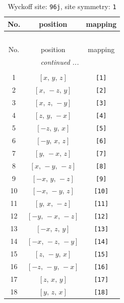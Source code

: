 \documentclass[fleqn,8pt]{jsarticle}
\begin{document}
\begin{longtable}{ccc}
\caption{Wyckoff site: {\tt 96j}, site symmetry: {\tt 1}}
 \\
 \hline \hline
No. & position & mapping \\ \hline \endfirsthead

\multicolumn{2}{l}{\tablename\ \thetable{}} \\
 \hline \hline
No. & position & mapping \\ \hline \endhead

 \hline \hline
\multicolumn{2}{r}{\footnotesize\it continued ...} \\ \endfoot

 \hline \hline
\multicolumn{2}{r}{} \\ \endlastfoot

1 & $\left[ x,\, y,\, z \right]$ & {\tt [1]} \\ \hline
2 & $\left[ x,\, - z,\, y \right]$ & {\tt [2]} \\ \hline
3 & $\left[ x,\, z,\, - y \right]$ & {\tt [3]} \\ \hline
4 & $\left[ z,\, y,\, - x \right]$ & {\tt [4]} \\ \hline
5 & $\left[ - z,\, y,\, x \right]$ & {\tt [5]} \\ \hline
6 & $\left[ - y,\, x,\, z \right]$ & {\tt [6]} \\ \hline
7 & $\left[ y,\, - x,\, z \right]$ & {\tt [7]} \\ \hline
8 & $\left[ x,\, - y,\, - z \right]$ & {\tt [8]} \\ \hline
9 & $\left[ - x,\, y,\, - z \right]$ & {\tt [9]} \\ \hline
10 & $\left[ - x,\, - y,\, z \right]$ & {\tt [10]} \\ \hline
11 & $\left[ y,\, x,\, - z \right]$ & {\tt [11]} \\ \hline
12 & $\left[ - y,\, - x,\, - z \right]$ & {\tt [12]} \\ \hline
13 & $\left[ - x,\, z,\, y \right]$ & {\tt [13]} \\ \hline
14 & $\left[ - x,\, - z,\, - y \right]$ & {\tt [14]} \\ \hline
15 & $\left[ z,\, - y,\, x \right]$ & {\tt [15]} \\ \hline
16 & $\left[ - z,\, - y,\, - x \right]$ & {\tt [16]} \\ \hline
17 & $\left[ z,\, x,\, y \right]$ & {\tt [17]} \\ \hline
18 & $\left[ y,\, z,\, x \right]$ & {\tt [18]} \\ \hline

\end{longtable}
\end{document}
